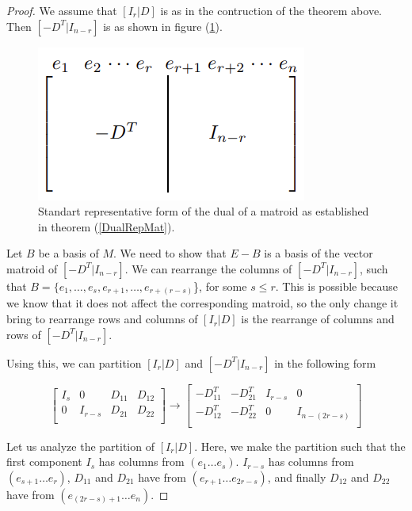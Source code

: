 \begin{proof}
    We assume that $[I_r|D]$ is as in the contruction of the theorem above. Then $[-D^T|I_{n-r}]$ is as shown in figure (\ref{MatRepresentationDual}).
    \begin{figure}[h]
        \centering
        \includegraphics{VMRDual.png}
        \caption{Standart representative form of the dual of a matroid as established in theorem (\ref{DualRepMat}). \cite{oxley1}} 
        \label{MatRepresentationDual}
    \end{figure}

    Let $B$ be a basis of $M$. We need to show that $E-B$ is a basis of the vector matroid of $[-D^T|I_{n-r}]$. We can rearrange the columns of $[-D^T|I_{n-r}]$, such that $B=\{e_1,\dots,e_s, e_{r+1}, \dots, e_{r+(r-s)}$\}, for some $s \leq r$. This is possible because we know that it does not affect the corresponding matroid, so the only change it bring to rearrange rows and columns of $[I_r|D]$ is the rearrange of columns and rows of $[-D^T|I_{n-r}]$. 
    
    Using this, we can partition $[I_r|D]$ and $[-D^T|I_{n-r}]$ in the following form
    \begin{figure}[H]
    $$\begin{bmatrix}
    I_s & 0 & D_{11} & D_{12}\\
    0 & I_{r-s} & D_{21} & D_{22}\\
    \end{bmatrix}
    \rightarrow
    \begin{bmatrix}
    -D_{11}^T & -D_{21}^T & I_{r-s} & 0\\
    -D_{12}^T & -D_{22}^T & 0 & I_{n-(2r-s)}\\
    \end{bmatrix}$$
    \end{figure}
    Let us analyze the partition of $[I_r|D]$.
    Here, we make the partition such that the first component $I_s$ has columns from $(e_1 \dots e_s)$. $I_{r-s}$ has columns from $(e_{s+1} \dots e_r)$, $D_11$ and $D_21$ have from $(e_{r+1} \dots e_{2r-s})$, and finally $D_{12}$ and $D_{22}$ have from $(e_{(2r-s)+1} \dots e_n)$.
    

\end{proof}
